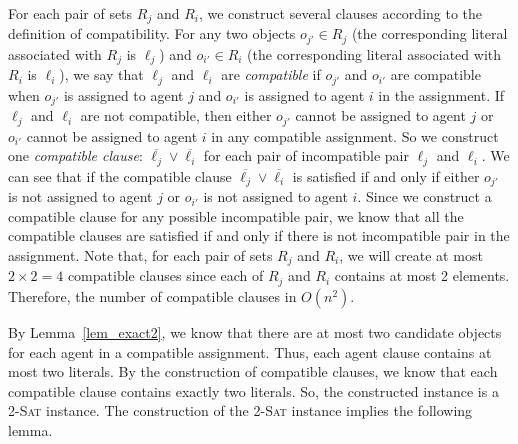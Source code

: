 For each pair of sets $R_{j}$ and $R_{i}$, we construct several clauses according to the definition of compatibility.
For any two objects $o_{j'}\in R_j$ (the corresponding literal associated with $R_j$ is $\ell_j$) and $o_{i'}\in R_i$ (the corresponding literal associated with $R_i$ is $\ell_i$), we say that $\ell_j$ and $\ell_i$ are \emph{compatible} if $o_{j'}$ and $o_{i'}$ are compatible when $o_{j'}$ is assigned to agent $j$ and $o_{i'}$ is assigned to agent $i$ in the assignment.
If $\ell_j$ and $\ell_i$ are not compatible, then either $o_{j'}$ cannot be assigned to agent $j$ or $o_{i'}$ cannot be assigned to agent $i$ in any compatible assignment. So we construct one \emph{compatible clause}: $\overline{\ell_j} \vee \overline{\ell_i}$ for each pair of
incompatible pair $\ell_j$ and $\ell_i$.
We can see that if the compatible clause $\overline{\ell_j} \vee \overline{\ell_i}$ is satisfied if and only if
either $o_{j'}$ is not assigned to agent $j$ or $o_{i'}$ is not assigned to agent $i$. Since we construct a compatible clause for any possible incompatible pair,
we know that all the compatible clauses are satisfied if and only if there is not incompatible pair in the assignment.
Note that, for each pair of sets $R_{j}$ and $R_{i}$, we will create at most $2\times2=4$ compatible clauses since each of $R_{j}$ and $R_{i}$ contains at most 2 elements.
Therefore, the number of compatible clauses in $O(n^2)$.


By Lemma~\ref{lem_exact2}, we know that there are at most two candidate objects for each agent in a compatible assignment.
Thus, each agent clause contains at most two literals.
By the construction of compatible clauses, we know that each compatible clause contains exactly two literals.
So, the constructed instance is a \textsc{2-Sat} instance.
The construction of the \textsc{2-Sat} instance implies the following lemma.


